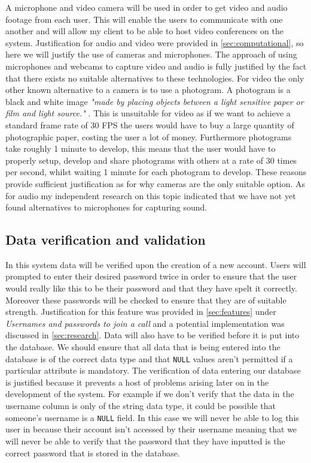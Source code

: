 A microphone and video camera will be used in order to get 
video and audio footage from each user. This will enable the 
users to communicate with one another and will allow my client
to be able to host video conferences on the system. 
Justification for audio and video were provided in 
\ref{sec:computational}, so here we will justify the use of 
cameras and microphones. The approach of using microphones and
webcams to capture video and audio is fully justified by the
fact that there exists no suitable alternatives to these 
technologies. For video the only other known alternative to a
camera is to use a photogram. A photogram is a black and white
image \textit{"made by placing objects between a light 
sensitive paper or film and light source."} \cite{photo}. This
is unsuitable for video as if we want to achieve a standard
frame rate of 30 FPS the users would have to buy a large
quantity of photographic paper, costing the user a lot of
money. Furthermore photograms take roughly 1 minute to
develop, this means that the user would have to properly setup,
develop and share photograms with others at a rate of 30 times
per second, whilst waiting 1 minute for each photogram to
develop. These reasons provide sufficient justification as for
why cameras are the only suitable option. As for audio my 
independent research on this topic indicated that we have not
yet found alternatives to microphones for capturing sound. 

\subsection{Data verification and validation}

In this system data will be verified upon the creation of a
new account. Users will prompted to enter their desired
password twice in order to ensure that the user would really 
like this to be their password and that they have spelt it 
correctly. Moreover these passwords will be checked to 
ensure that they are of suitable strength. Justification for 
this feature was provided in \ref{sec:features} under 
\textit{Usernames and passwords to join a call} and a
potential implementation was discussed in \ref{sec:research}.
Data will also have to be verified before it is put into the 
database. We should ensure that all data that is being entered
into the database is of the correct data type and that
\texttt{NULL} values aren't permitted if a particular 
attribute is mandatory. The verification of data entering our
database is justified because it prevents a host of problems 
arising later on in the development of the system. For example
if we don't verify that the data in the username column is 
only of the string data type, it could be possible that 
someone's username is a \texttt{NULL} field. In this case we 
will never be able to log this user in because their account
isn't accessed by their username meaning that we will never be
able to verify that the password that they have inputted is the 
correct password that is stored in the database.

